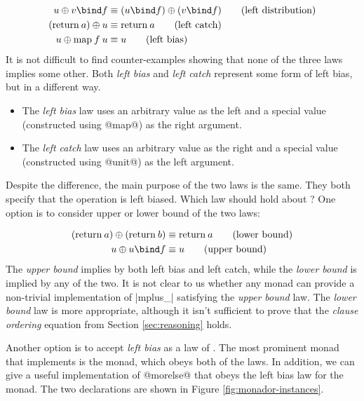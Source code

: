 \documentclass[preprint]{sigplanconf}
\begin{document}
\begin{align*}
  u \mplus v \bind f &\equiv (u \bind f) \mplus (v \bind f) \tag{left distribution}\\
  (\text{return} \: a) \mplus u &\equiv \text{return} \: a \tag{left catch} \\
  u \morelse \map \: f \: u &\equiv u \tag{left bias}
\end{align*}
It is not difficult to find counter-examples showing that none of the three laws implies some other.
Both \textit{left bias} and \textit{left catch} represent some form of left bias, but in a 
different way. 

\begin{itemize}
\item The \textit{left bias} law uses an arbitrary value as the left
  and a special value (constructed using @map@) as the right argument. 

\item The \textit{left catch} law uses an arbitrary value as the right 
  and a special value (constructed using @unit@) as the left argument. 
\end{itemize}
Despite the difference, the main purpose of the two laws is the same. They both specify that the 
operation is left biased. Which law should hold about ? One option is to consider 
upper or lower bound of the two laws:

\begin{align*}
  (\text{return} \: a) \mplus (\text{return} \: b) &\equiv \text{return} \: a \tag{lower bound} \\
  u \morelse u \bind f &\equiv u \tag{upper bound}
\end{align*}
The \textit{upper bound} implies by both left bias and left catch, while the \textit{lower
bound} is implied by any of the two. It is not clear to us whether any monad can provide a 
non-trivial implementation of |mplus_| satisfying the \textit{upper bound} law. 
The \textit{lower bound} law is more appropriate, although it isn't sufficient to prove that the 
\textit{clause ordering} equation from Section \ref{sec:reasoning} holds.

Another option is to accept \textit{left bias} as a law of . The most prominent 
monad that implements  is the  monad, which obeys both of the laws. In
addition, we can give a useful implementation of @morelse@ that obeys the left bias law for 
the  monad. The two declarations are shown in Figure \ref{fig:monador-instances}.
\end{document}
